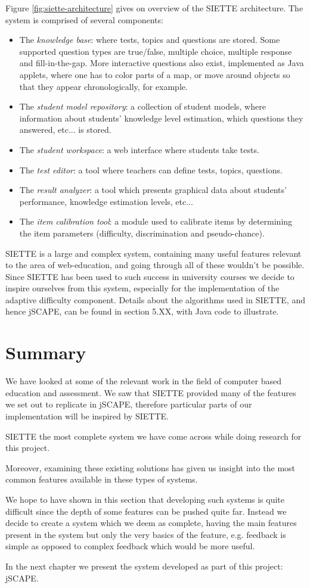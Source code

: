 Figure \ref{fig:siette-architecture} gives on overview of the SIETTE architecture. The system is comprised of several components\cite{SIETTE-components}:
\begin{itemize}
\item The \textit{knowledge base}: where tests, topics and questions are stored. Some supported question types are true/false, multiple choice, multiple response and fill-in-the-gap. More interactive questions also exist, implemented as Java applets, where one has to color parts of a map, or move around objects so that they appear chronologically, for example.
\item The \textit{student model repository}: a collection of student models, where information about students' knowledge level estimation, which questions they answered, etc... is stored.
\item The \textit{student workspace}: a web interface where students take tests.
\item The \textit{test editor}: a tool where teachers can define tests, topics, questions.
\item The \textit{result analyzer}: a tool which presents graphical data about students' performance, knowledge estimation levels, etc...
\item The \textit{item calibration tool}: a module used to calibrate items by determining the item parameters (difficulty, discrimination and pseudo-chance).
\end{itemize}

SIETTE is a large and complex system, containing many useful features relevant to the area of web-education, and going through all of these wouldn't be possible. Since SIETTE has been used to such success in university courses we decide to inspire ourselves from this system, especially for the implementation of the adaptive difficulty component. Details about the algorithms used in SIETTE, and hence jSCAPE, can be found in section 5.XX, with Java code to illustrate.

\section{Summary}
We have looked at some of the relevant work in the field of computer based education and assessment. We saw that SIETTE provided many of the features we set out to replicate in jSCAPE, therefore particular parts of our implementation will be inspired by SIETTE.

SIETTE the most complete system we have come across while doing research for this project.

Moreover, examining these existing solutions has given us insight into the most common features available in these types of systems.

We hope to have shown in this section that developing such systems is quite difficult since the depth of some features can be pushed quite far. Instead we decide to create a system which we deem as complete, having the main features present in the system but only the very basics of the feature, e.g. feedback is simple as opposed to complex feedback which would be more useful.

In the next chapter we present the system developed as part of this project: jSCAPE. 